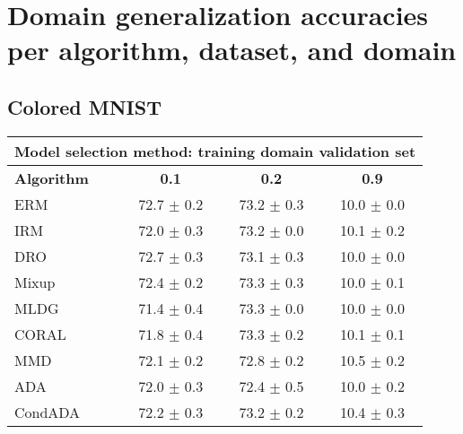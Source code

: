 \documentclass{article}
\begin{document}
\clearpage
\newpage
\section{Domain generalization accuracies per algorithm, dataset, and domain}
\label{app:full_results}
\subsection{Colored MNIST}
\begin{center}
\begin{tabular}{lccc}
\toprule
\multicolumn{4}{c}{\textbf{Model selection method: training domain validation set}} \\
\midrule
\textbf{Algorithm}    & \textbf{0.1}              & \textbf{0.2}              & \textbf{0.9}              \\
\midrule
ERM                       & 72.7 $\pm$ 0.2            & 73.2 $\pm$ 0.3            & 10.0 $\pm$ 0.0            \\
IRM                       & 72.0 $\pm$ 0.3            & 73.2 $\pm$ 0.0            & 10.1 $\pm$ 0.2            \\
DRO                 & 72.7 $\pm$ 0.3            & 73.1 $\pm$ 0.3            & 10.0 $\pm$ 0.0            \\
Mixup                     & 72.4 $\pm$ 0.2            & 73.3 $\pm$ 0.3            & 10.0 $\pm$ 0.1            \\
MLDG                      & 71.4 $\pm$ 0.4            & 73.3 $\pm$ 0.0            & 10.0 $\pm$ 0.0            \\
CORAL                     & 71.8 $\pm$ 0.4            & 73.3 $\pm$ 0.2            & 10.1 $\pm$ 0.1            \\
MMD                       & 72.1 $\pm$ 0.2            & 72.8 $\pm$ 0.2            & 10.5 $\pm$ 0.2            \\
ADA                       & 72.0 $\pm$ 0.3            & 72.4 $\pm$ 0.5            & 10.0 $\pm$ 0.2            \\
CondADA                   & 72.2 $\pm$ 0.3            & 73.2 $\pm$ 0.2            & 10.4 $\pm$ 0.3            \\
\bottomrule
\end{tabular}
\end{center}
\end{document}
